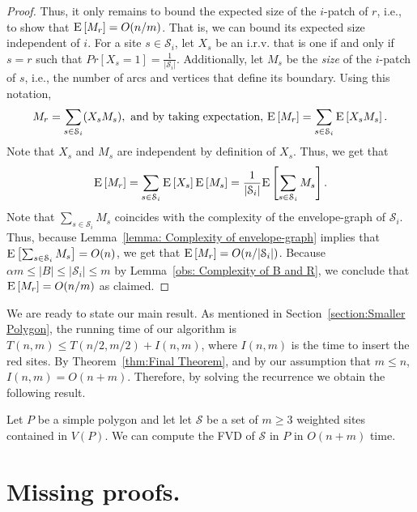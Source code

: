\documentclass[a4paper,UKenglish]{socg-lipics-v2018}
\newcommand{\icell}[1][i]{${#1}$-patch\xspace}
\newcommand{\s}{\mathcal S}
\newcommand{\ex}[1]{\textsc{E}\left[#1\right]}
\begin{document}
{\begin{proof}
Thus, it only remains to bound the expected size of the \icell of $r$, i.e., to show that $\ex{M_r} = O(n/m)$.
That is, we can bound its expected size independent of $i$.
For a site $s\in \s_i$, let $X_s$ be an i.r.v. that is one if and only if $s = r$ such that $Pr[X_s = 1] = \frac{1}{|\s_i|}$.
Additionally, let $M_s$ be the \emph{size} of the \icell of $s$, i.e., the number of arcs and vertices that define its boundary. 
Using this notation,
\[M_r = \sum_{s\in \s_i} ( X_s M_s), \text{ and by taking expectation, } \ex{M_r} = \sum_{s\in \s_i} \ex{X_s M_s}.\]
Note that $X_s$ and $M_s$ are independent by definition of $X_s$.
Thus, we get that  
\[\ex{M_r} = \sum_{s\in \s_i} \ex{X_s} \ex{M_s} = \frac{1}{|\s_i|} \ex{\sum_{s\in \s_i} M_s}.\]
Note that $\sum_{s\in \s_i} M_s$ coincides with the complexity of the envelope-graph of $\s_i$.
Thus, because Lemma~\ref{lemma: Complexity of envelope-graph} implies that $\ex{\sum_{s\in \s_i} M_s} = O(n)$, we get that  $\ex{M_r} = O(n/|\s_i|)$.
Because $\alpha m \leq |B| \leq |\s_i| \leq m$ by Lemma~\ref{obs: Complexity of B and R}, we conclude that $\ex{M_r} = O(n/m)$ as claimed.
\end{proof}
}

We are ready to state our main result. As mentioned in Section~\ref{section:Smaller Polygon}, the running time of our algorithm is $T(n,m) \leq T(n/2, m/2) + I(n,m)$, where $I(n, m)$ is the time to insert the red sites. By Theorem~\ref{thm:Final Theorem}, and by our assumption that $m\leq n$, $I(n,m) = O(n + m)$. Therefore, by solving the recurrence we obtain the following result.

\begin{theorem}
Let  $P$ be a simple polygon and let let $\s$ be a set of $m\geq 3$ weighted sites contained in $V(P)$.
We can compute the FVD of $\s$ in $P$ in $O(n+m)$ time. 
\end{theorem}



%


\newpage 
\appendix
\section{Missing proofs.}
\setcounter{theorem}{5}
\ProofApexFVD
\setcounter{theorem}{8}
\ProofPropertiesOfQ
\ProofSPMForSitesR
\pagebreak
\setcounter{theorem}{11}
\ProofDistanceCoincideCell
\setcounter{theorem}{12}
\ProofShadowPoints
\setcounter{theorem}{14}
\ProofPatchContainsVcell
\setcounter{theorem}{15}
\ProofStructureEnvelope
\setcounter{theorem}{16}
\ProofPatchInGr
\setcounter{theorem}{17}
\ProofTimeInsertionR
\setcounter{theorem}{18}
\ProofComplexityEnvelope
\setcounter{theorem}{19}
\ProofFinalTheorem
\end{document}
